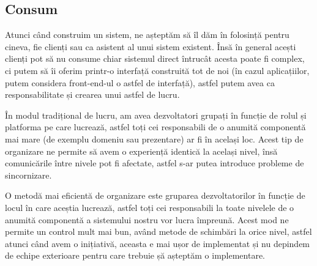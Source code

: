 \subsection{Consum}

Atunci când construim un sistem, ne așteptăm să îl dăm în folosință pentru cineva,
fie clienți sau ca asistent al unui sistem existent. Însă în general acești clienți pot să
nu consume chiar sistemul direct întrucât acesta poate fi complex, ci putem să îi oferim printr-o
interfață construită tot de noi (în cazul aplicațiilor, putem considera front-end-ul o astfel
de interfață), astfel putem avea ca responsabilitate și crearea unui astfel de lucru.

În modul tradițional de lucru, am avea dezvoltatori grupați în funcție de rolul și platforma pe care
lucrează, astfel toți cei responsabili de o anumită componentă mai mare (de exemplu domeniu
sau prezentare) ar fi în același loc. Acest tip de organizare ne permite să avem o 
experiență identică la același nivel, însă comunicările între nivele pot fi afectate, astfel 
s-ar putea introduce probleme de sincornizare.

O metodă mai eficientă de organizare este gruparea dezvoltatorilor în funcție de locul în care
aceștia lucrează, astfel toți cei responsabili la toate nivelele de o anumită componentă a
sistemului nostru vor lucra împreună. Acest mod ne permite un control mult mai bun, având
metode de schimbări la orice nivel, astfel atunci când avem o inițiativă, aceasta e mai ușor 
de implementat și nu depindem de echipe exterioare pentru care trebuie șă așteptăm 
o implementare.

